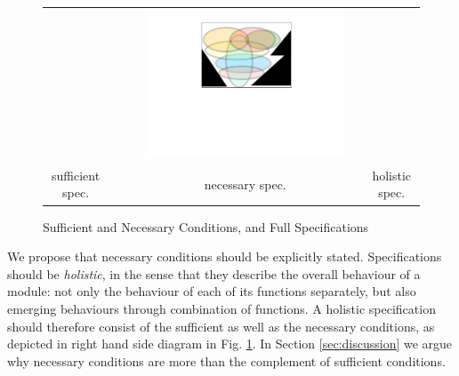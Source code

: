 \begin{figure}[htb]
\begin{tabular}{ccccc}
\begin{minipage}{0.25\textwidth}
\end{minipage}
 & \ \ \ &
\begin{minipage}{0.25\textwidth}
 \includegraphics[width=\linewidth, trim=250  320 260 60,clip]{diagrams/NecAndSuff.pdf}
\end{minipage}
\\
sufficient  spec.& & necessary spec. & & holistic spec.
 \end{tabular}
  \vspace*{-2.5mm}
  \caption{Sufficient and Necessary Conditions, and Full Specifications}
 \label{fig:NecessaryAndSuff}
 \end{figure}
 
 We propose that  necessary conditions should be explicitly stated. Specifications should be \emph{holistic}, in the sense that they describe the  overall behaviour of a module: not only the behaviour of each of its functions separately, but also 
 emerging behaviours through combination of functions.
A holistic specification should therefore consist of   the sufficient as well as the necessary conditions, as  
depicted in right hand side  diagram in Fig. \ref{fig:NecessaryAndSuff}.
In Section \ref{sec:discussion} we argue why necessary conditions are more than the complement of
sufficient conditions.

